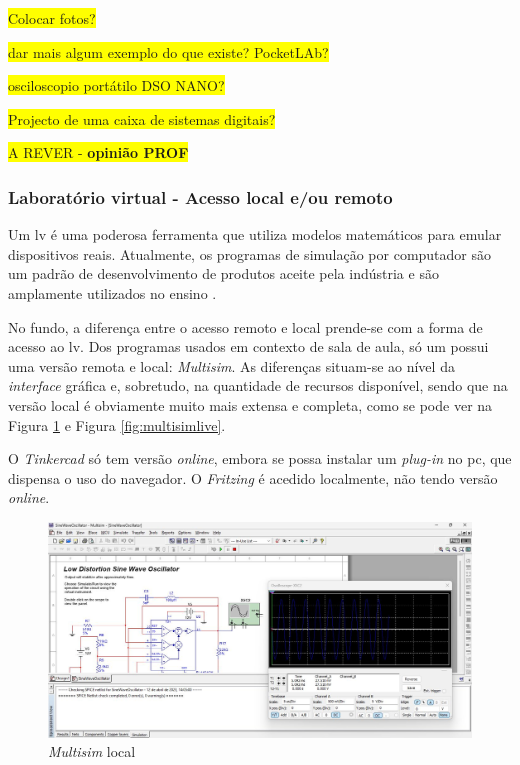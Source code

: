 \colorbox{yellow}{Colocar fotos?}

\colorbox{yellow}{dar mais algum exemplo do que existe? PocketLAb?}

\colorbox{yellow}{osciloscopio portátilo DSO NANO?}

\colorbox{yellow}{Projecto de uma caixa de sistemas digitais?}

\colorbox{yellow}{A REVER - \textbf{opinião PROF}}


\subsubsection{Laboratório virtual - Acesso local e/ou remoto}
Um \acrshort{lv} é uma poderosa ferramenta que utiliza modelos matemáticos para emular dispositivos reais. Atualmente, os programas de simulação por computador são um padrão de desenvolvimento de produtos aceite pela indústria e são amplamente utilizados no ensino \cite{HERADIO20161} \cite{POTKONJAK2016309}.

No fundo, a diferença entre o acesso remoto e local prende-se com a forma de acesso ao \acrshort{lv}.
Dos programas usados em contexto de sala de aula, só um possui uma versão remota e local: \textit{Multisim}\cite{multisim}. As diferenças situam-se ao nível da \textit{interface} gráfica e, sobretudo, na quantidade de recursos disponível, sendo que na versão local é obviamente muito mais extensa e completa, como se pode ver na Figura \ref{fig:multisimlocal} e Figura \ref{fig:multisimlive}.

O \textit{Tinkercad}\cite{tinkercad} só tem versão \textit{online}, embora se possa instalar um \textit{plug-in} no \acrshort{pc}, que dispensa o uso do navegador. O \textit{Fritzing} \cite{fritzingdown} é acedido localmente, não tendo versão \textit{online}.

\begin{figure}[hbtp]
    \centering
    \includegraphics[width=0.9\linewidth]{figures/Multisim_Desktop.png}
    \caption{\textit{Multisim} local}
    \label{fig:multisimlocal}
\end{figure}

